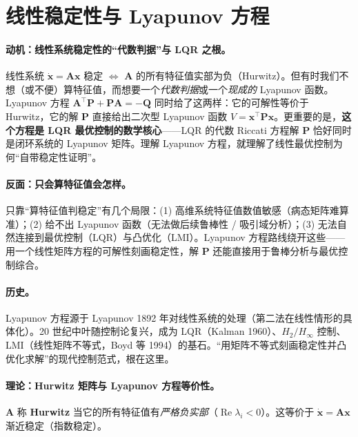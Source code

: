 \section{线性稳定性与 Lyapunov 方程}
\label{sec:ode-lyapeq}

\paragraph{动机：线性系统稳定性的“代数判据”与 LQR 之根。}
线性系统 $\dot{\mathbf{x}}=\mathbf{A}\mathbf{x}$ 稳定 $\iff$ $\mathbf{A}$ 的所有特征值实部为负（Hurwitz）。但有时我们不想（或不便）算特征值，而想要一个\emph{代数判据}或一个\emph{现成的} Lyapunov 函数。Lyapunov 方程 $\mathbf{A}^\top\mathbf{P}+\mathbf{P}\mathbf{A}=-\mathbf{Q}$ 同时给了这两样：它的可解性等价于 Hurwitz，它的解 $\mathbf{P}$ 直接给出二次型 Lyapunov 函数 $V=\mathbf{x}^\top\mathbf{P}\mathbf{x}$。更重要的是，\textbf{这个方程是 LQR 最优控制的数学核心}——LQR 的代数 Riccati 方程解 $\mathbf{P}$ 恰好同时是闭环系统的 Lyapunov 矩阵。理解 Lyapunov 方程，就理解了线性最优控制为何“自带稳定性证明”。

\paragraph{反面：只会算特征值会怎样。}
只靠“算特征值判稳定”有几个局限：(1) 高维系统特征值数值敏感（病态矩阵难算准）；(2) 给不出 Lyapunov 函数（无法做后续鲁棒性 / 吸引域分析）；(3) 无法自然连接到最优控制（LQR）与凸优化（LMI）。Lyapunov 方程路线绕开这些——用一个线性矩阵方程的可解性刻画稳定性，解 $\mathbf{P}$ 还能直接用于鲁棒分析与最优控制综合\cite{boyd1994linear}。

\paragraph{历史。}
Lyapunov 方程源于 Lyapunov 1892 年对线性系统的处理（第二法在线性情形的具体化）。20 世纪中叶随控制论复兴，成为 LQR（Kalman 1960）、$H_2/H_\infty$ 控制、LMI（线性矩阵不等式，Boyd 等 1994）的基石。“用矩阵不等式刻画稳定性并凸优化求解”的现代控制范式，根在这里。

\paragraph{理论：Hurwitz 矩阵与 Lyapunov 方程等价性。}

\begin{definition}[Hurwitz 矩阵]\label{def:hurwitz}
$\mathbf{A}$ 称 \textbf{Hurwitz} 当它的所有特征值有\emph{严格负实部}（$\operatorname{Re}\lambda_i<0$）。这等价于 $\dot{\mathbf{x}}=\mathbf{A}\mathbf{x}$ 渐近稳定（指数稳定）。
\end{definition}

